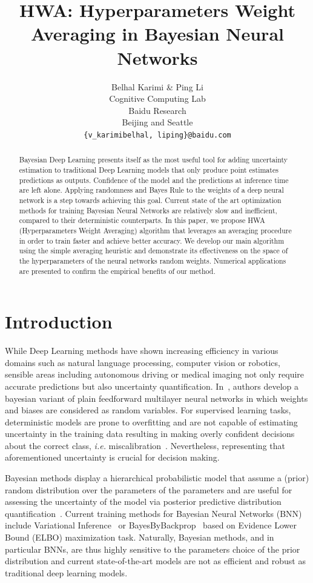 \documentclass{article} %
\title{HWA: Hyperparameters Weight Averaging in Bayesian Neural Networks}
\author{Belhal Karimi \& Ping Li \\
Cognitive Computing Lab\\
Baidu Research\\
Beijing and Seattle \\
\texttt{\{v_karimibelhal, liping\}@baidu.com} \\
}
\begin{document}
\maketitle

\begin{abstract}
Bayesian Deep Learning presents itself as the most useful tool for adding uncertainty estimation to traditional Deep Learning models that only produce point estimates predictions as outputs. Confidence of the model and the predictions at inference time are left alone. Applying randomness and Bayes Rule to the weights of a deep neural network is a step towards achieving this goal. Current state of the art optimization methods for training Bayesian Neural Networks are relatively slow and inefficient, compared to their deterministic counterparts. In this paper, we propose \textsc{HWA} (Hyperparameters Weight Averaging) algorithm that leverages an averaging procedure in order to train faster and achieve better accuracy. We develop our main algorithm using the simple averaging heuristic and demonstrate its effectiveness on the space of the hyperparameters of the neural networks random weights. Numerical applications are presented to confirm the empirical benefits of our method.
\end{abstract}

\section{Introduction}
While Deep Learning methods have shown increasing efficiency in various domains such as natural language processing, computer vision or robotics, sensible areas including autonomous driving or medical imaging not only require accurate predictions but also uncertainty quantification.
In~\citep{neal2012bayesian}, authors develop a bayesian variant of plain feedforward multilayer neural networks in which weights and biases are considered as random variables.
For supervised learning tasks, deterministic models are prone to overfitting and are not capable of estimating uncertainty in the training data resulting in making overly confident decisions about the correct class, \textit{i.e.} miscalibration~\citep{guo2017calibration,kendall2017uncertainties}.
Nevertheless, representing that aforementioned uncertainty is crucial for decision making.

Bayesian methods display a hierarchical probabilistic model that assume a (prior) random distribution over the parameters of the parameters and are useful for assessing the uncertainty of the model via posterior predictive distribution quantification~\citep{blundell2015weight,kingma2015variational}.
Current training methods for Bayesian Neural Networks (BNN)~\citep{neal2012bayesian} include Variational Inference~\citep{graves2011practical, hoffman2013stochastic} or BayesByBackprop~\citep{blundell2015weight} based on Evidence Lower Bound (ELBO) maximization task.
Naturally, Bayesian methods, and in particular BNNs, are thus highly sensitive to the parameters choice of the prior distribution and current state-of-the-art models are not as efficient and robust as traditional deep learning models.
\end{document}
